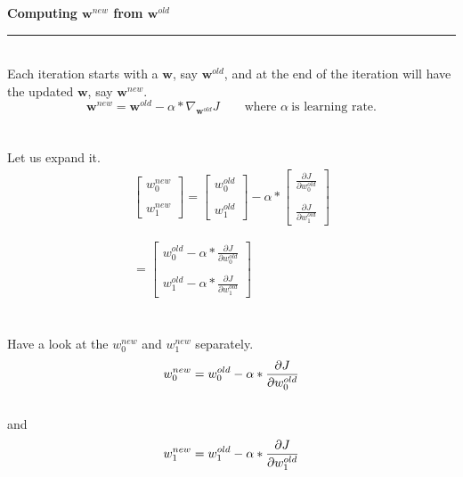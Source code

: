 \documentclass[12pt]{article}
\begin{document}
\break
{\Large \textbf{Computing $\mathbf{w}^{new}$ from $\mathbf{w}^{old}$}} \\
\rule{\textwidth}{1pt}
\vspace{3mm} \\
\noindent Each iteration starts with a $\mathbf{w}$, say $\mathbf{w}^{old}$, and at the end of the iteration will have the updated $\mathbf{w}$, say $\mathbf{w}^{new}$.  
\[
 \mathbf{w}^{new} = \mathbf{w}^{old} - \alpha * \nabla_{\mathbf{w}^{old}} J \qquad \text{where } \alpha\ \text{is learning rate.} 
\] \\
\vspace{3mm} \\ 
\noindent Let us expand it.
\begin{eqnarray*}
\begin{bmatrix}
    w_0^{new} \\
 \\
    w_1^{new}
\end{bmatrix}
=
\begin{bmatrix}
    w_0^{old} \\
 \\
    w_1^{old}
\end{bmatrix}
-
\alpha *
\begin{bmatrix}
    \frac{\partial J}{\partial w_0^{old}} \\
\\
    \frac{\partial J}{\partial w_1^{old}} 
\end{bmatrix}  \\
\\
\\
=
\begin{bmatrix}
    w_0^{old} - \alpha * \frac{\partial J}{\partial w_0^{old}} \\
 \\
    w_1^{old} - \alpha * \frac{\partial J}{\partial w_1^{old}} 
\end{bmatrix}
\end{eqnarray*} \\
\vspace{3mm} \\ 
\noindent Have a look at the $w_0^{new}$ and $w_1^{new}$ separately. \\
\vspace{3mm}
\[
    w_0^{new} = w_0^{old} - \alpha * \frac{\partial J}{\partial w_0^{old}} \\
\]
\\
\noindent and
\\ 
\[
 w_1^{new} =  w_1^{old} - \alpha * \frac{\partial J}{\partial w_1^{old}} \\
\]
\end{document}
